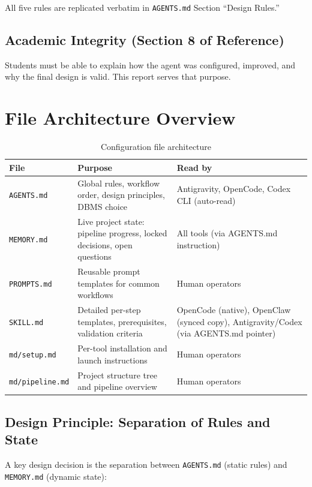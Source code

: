 \documentclass[12pt,a4paper]{article}
\begin{document}
All five rules are replicated verbatim in \texttt{AGENTS.md} Section ``Design Rules.''

\subsection{Academic Integrity (Section 8 of Reference)}

Students must be able to explain how the agent was configured, improved, and why the final design is valid. This report serves that purpose.

\section{File Architecture Overview}

\begin{table}[h]
\centering
\begin{tabular}{|l|p{4.5cm}|p{4.5cm}|}
\hline
\textbf{File} & \textbf{Purpose} & \textbf{Read by} \\
\hline
\texttt{AGENTS.md} & Global rules, workflow order, design principles, DBMS choice & Antigravity, OpenCode, Codex CLI (auto-read) \\
\hline
\texttt{MEMORY.md} & Live project state: pipeline progress, locked decisions, open questions & All tools (via AGENTS.md instruction) \\
\hline
\texttt{PROMPTS.md} & Reusable prompt templates for common workflows & Human operators \\
\hline
\texttt{SKILL.md} & Detailed per-step templates, prerequisites, validation criteria & OpenCode (native), OpenClaw (synced copy), Antigravity/Codex (via AGENTS.md pointer) \\
\hline
\texttt{md/setup.md} & Per-tool installation and launch instructions & Human operators \\
\hline
\texttt{md/pipeline.md} & Project structure tree and pipeline overview & Human operators \\
\hline
\end{tabular}
\caption{Configuration file architecture}
\end{table}

\subsection{Design Principle: Separation of Rules and State}

A key design decision is the separation between \texttt{AGENTS.md} (static rules) and \texttt{MEMORY.md} (dynamic state):
\end{document}
